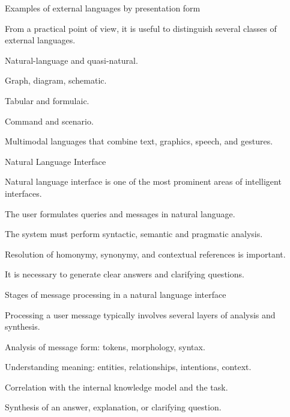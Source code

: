 \begin{frame}{Examples of external languages by presentation form}
	\topline
	\justifying
	
	From a practical point of view, it is useful to distinguish several classes of external languages.
	
	\begin{textitemize}
		\item Natural-language and quasi-natural.
		\item Graph, diagram, schematic.
		\item Tabular and formulaic.
		\item Command and scenario.
		\item Multimodal languages that combine text, graphics, speech, and gestures.
	\end{textitemize}
\end{frame}

\begin{frame}{Natural Language Interface}
	\topline
	\justifying
	
	Natural language interface is one of the most prominent areas of intelligent interfaces.
	
	\begin{textitemize}
		\item The user formulates queries and messages in natural language.
		\item The system must perform syntactic, semantic and pragmatic analysis.
		\item Resolution of homonymy, synonymy, and contextual references is important.
		\item It is necessary to generate clear answers and clarifying questions.
	\end{textitemize}
\end{frame}

\begin{frame}{Stages of message processing in a natural language interface}
	\topline
	\justifying
	
	Processing a user message typically involves several layers of analysis and synthesis.
	
	\begin{textitemize}
		\item Analysis of message form: tokens, morphology, syntax.
		\item Understanding meaning: entities, relationships, intentions, context.
		\item Correlation with the internal knowledge model and the task.
		\item Synthesis of an answer, explanation, or clarifying question.
	\end{textitemize}
\end{frame}

